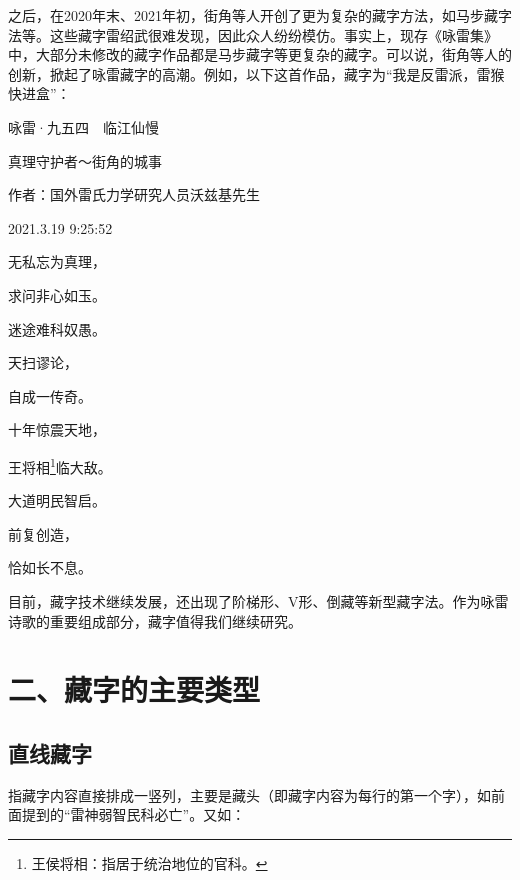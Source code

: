 \documentclass[UTF8,12pt,oneside]{ctexbook}
\begin{document}
        之后，在2020年末、2021年初，街角等人开创了更为复杂的藏字方法，如马步藏字法等。这些藏字雷绍武很难发现，因此众人纷纷模仿。事实上，现存《咏雷集》中，大部分未修改的藏字作品都是马步藏字等更复杂的藏字。可以说，街角等人的创新，掀起了咏雷藏字的高潮。例如，以下这首作品，藏字为“我是反雷派，雷猴快进盒”：

        \begin{center}
            \heiti 咏雷·九五四\ \ 临江仙慢

            \songti 真理守护者～街角的城事

            作者：国外雷氏力学研究人员沃兹基先生

            2021.3.19 9:25:52
            
            \kaishu
            无私忘为真理，
            
            求问非心如玉。
            
            迷途难科奴愚。

            天扫谬论，\phantom{。。}

            自成一传奇。\phantom{。}
            
            十年惊震天地，
            
            王将相\footnote{王侯将相：指居于统治地位的官科。}临大敌。
            
            大道明民智启。
            
            前复创造，\phantom{。。}
            
            恰如长不息。\phantom{。}

        \end{center}
            
        目前，藏字技术继续发展，还出现了阶梯形、V形、倒藏等新型藏字法。作为咏雷诗歌的重要组成部分，藏字值得我们继续研究。

    \section{二、藏字的主要类型}
        \subsection{直线藏字}

        指藏字内容直接排成一竖列，主要是藏头（即藏字内容为每行的第一个字），如前面提到的“雷神弱智民科必亡”。又如：
\end{document}
